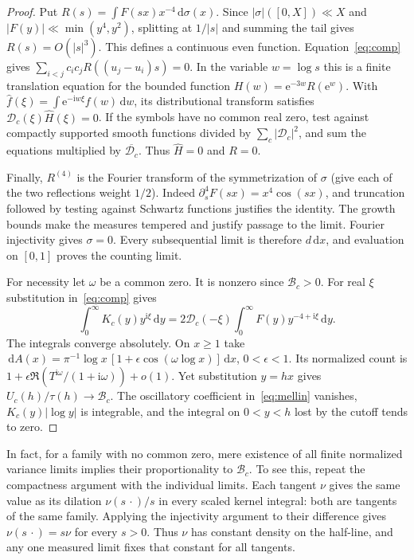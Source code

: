 \documentclass[11pt,letterpaper]{article}
\newcommand{\dd}{\,\mathrm d}
\newcommand{\ee}{\mathrm e}
\newcommand{\ii}{\mathrm i}
\newcommand{\abs}[1]{\lvert#1\rvert}
\newcommand{\sym}{\mathcal D}
\newcommand{\BB}{\mathcal B}
\begin{document}
\begin{proof}
Put $R(s)=\int F(sx)x^{-4}\dd\sigma(x)$. Since $\abs{\sigma}([0,X])\ll X$ and $\abs{F(y)}\ll\min(y^4,y^2)$, splitting at $1/\abs s$ and summing the tail gives $R(s)=O(\abs{s}^3)$. This defines a continuous even function. Equation~\eqref{eq:comp} gives $\sum_{i<j}c_ic_jR((u_j-u_i)s)=0$. In the variable $w=\log s$ this is a finite translation equation for the bounded function $H(w)=\ee^{-3w}R(\ee^w)$. With $\widehat f(\xi)=\int\ee^{-\ii w\xi}f(w)\dd w$, its distributional transform satisfies $\sym_c(\xi)\widehat H(\xi)=0$. If the symbols have no common real zero, test against compactly supported smooth functions divided by $\sum_c\abs{\sym_c}^2$, and sum the equations multiplied by $\overline{\sym_c}$. Thus $\widehat H=0$ and $R=0$.

Finally, $R^{(4)}$ is the Fourier transform of the symmetrization of $\sigma$ (give each of the two reflections weight $1/2$). Indeed $\partial_s^4 F(sx)=x^4\cos(sx)$, and truncation followed by testing against Schwartz functions justifies the identity. The growth bounds make the measures tempered and justify passage to the limit. Fourier injectivity gives $\sigma=0$. Every subsequential limit is therefore $d\dd x$, and evaluation on $[0,1]$ proves the counting limit.

For necessity let $\omega$ be a common zero. It is nonzero since $\BB_c>0$. For real $\xi$ substitution in~\eqref{eq:comp} gives
\begin{equation}\label{eq:mellin}
 \int_0^\infty K_c(y)y^{\ii\xi}\dd y
 =2\sym_c(-\xi)\int_0^\infty F(y)y^{-4+\ii\xi}\dd y .
\end{equation}
The integrals converge absolutely. On $x\ge1$ take $\dd A(x)=\pi^{-1}\log x\,[1+\epsilon\cos(\omega\log x)]\dd x$, $0<\epsilon<1$. Its normalized count is $1+\epsilon\Re(T^{\ii\omega}/(1+\ii\omega))+o(1)$. Yet substitution $y=hx$ gives $U_c(h)/\tau(h)\to\BB_c$. The oscillatory coefficient in~\eqref{eq:mellin} vanishes, $K_c(y)\abs{\log y}$ is integrable, and the integral on $0<y<h$ lost by the cutoff tends to zero.
\end{proof}

In fact, for a family with no common zero, mere existence of all finite normalized variance limits implies their proportionality to $\BB_c$. To see this, repeat the compactness argument with the individual limits. Each tangent $\nu$ gives the same value as its dilation $\nu(s\,\cdot)/s$ in every scaled kernel integral: both are tangents of the same family. Applying the injectivity argument to their difference gives $\nu(s\,\cdot)=s\nu$ for every $s>0$. Thus $\nu$ has constant density on the half-line, and any one measured limit fixes that constant for all tangents.
\end{document}
